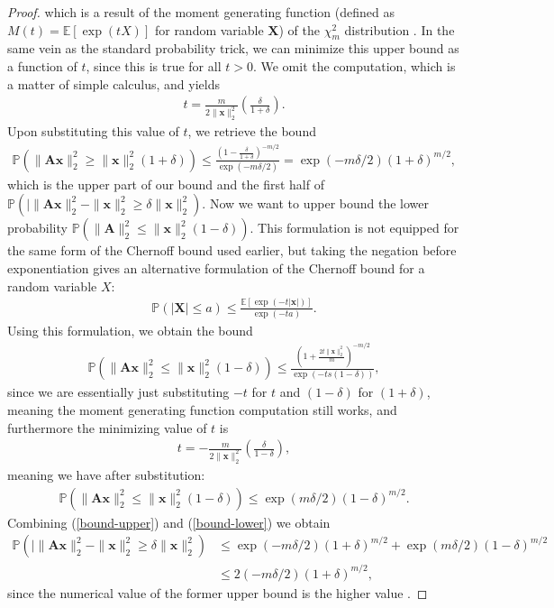 \documentclass[12pt,a4paper]{amsart}
\numberwithin{equation}{section}
\theoremstyle{plain}
\theoremstyle{definition}
\newcommand{\BE}{\mathbb E}
\newcommand{\BP}{\mathbb P}
\newcommand{\bdx}{\mathbf{x}}
\newcommand{\bdA}{\mathbf{A}}
\newcommand{\bdX}{\mathbf{X}}
\begin{document}
\begin{proof}
    which is a result of the moment generating function (defined as $M(t)=\BE\left[\exp(tX)\right]$ for random variable $\bdX$) of the $\chi_m^2$ distribution \cite{park-lee}. In the same vein as the standard probability trick, we can minimize this upper bound as a function of $t$, since this is true for all $t>0$. We omit the computation, which is a matter of simple calculus, and yields 
    \begin{align*}
        t=\frac{m}{2\|\bdx\|_2^2}\left(\frac{\delta}{1+\delta}\right).
    \end{align*}
    Upon substituting this value of $t$, we retrieve the bound
    \begin{align}\label{bound-upper}
        \BP(\|\bdA\bdx\|_2^2\geq\|\bdx\|_2^2(1+\delta))\leq\frac{\left(1-\frac{\delta}{1+\delta}\right)^{-m/2}}{\exp(-m\delta/2)}=\exp\left(-m\delta/2\right)(1+\delta)^{m/2},
    \end{align}
    which is the upper part of our bound and the first half of $\BP(|\|\bdA\bdx\|_2^2-\|\bdx\|_2^2\geq\delta\|\bdx\|_2^2)$. Now we want to upper bound the lower probability $\BP(\|\bdA\|_2^2\leq\|\bdx\|_2^2(1-\delta))$. This formulation is not equipped for the same form of the Chernoff bound used earlier, but taking the negation before exponentiation gives an alternative formulation of the Chernoff bound for a random variable $X$:
    \begin{align*}
        \BP(|\bdX|\leq a)\leq\frac{\BE\left[\exp(-t|\bdx|)\right]}{\exp(-ta)}.
    \end{align*}
    Using this formulation, we obtain the bound
    \begin{align*}
        \BP(\|\bdA\bdx\|_2^2\leq\|\bdx\|_2^2(1-\delta))\leq\frac{\left(1+\frac{2t\|\bdx\|_2^2}{m}\right)^{-m/2}}{\exp(-ts(1-\delta))},
    \end{align*}
    since we are essentially just substituting $-t$ for $t$ and $(1-\delta)$ for $(1+\delta)$, meaning the moment generating function computation still works, and furthermore the minimizing value of $t$ is
    \begin{align*}
        t=-\frac{m}{2\|\bdx\|_2^2}\left(\frac{\delta}{1-\delta}\right),
    \end{align*}
    meaning we have after substitution:
    \begin{align}\label{bound-lower}
        \BP(\|\bdA\bdx\|_2^2\leq\|\bdx\|_2^2(1-\delta))\leq\exp(m\delta/2)(1-\delta)^{m/2}.
    \end{align}
    Combining (\ref{bound-upper}) and (\ref{bound-lower}) we obtain
    \begin{align*}
        \BP(|\|\bdA\bdx\|_2^2-\|\bdx\|_2^2\geq\delta\|\bdx\|_2^2)&\leq\exp\left(-m\delta/2\right)(1+\delta)^{m/2}+\exp(m\delta/2)(1-\delta)^{m/2}\\&\leq2\left(-m\delta/2\right)(1+\delta)^{m/2},
    \end{align*}
    since the numerical value of the former upper bound is the higher value \cite{park-lee}.
    

\end{proof}
\end{document}
